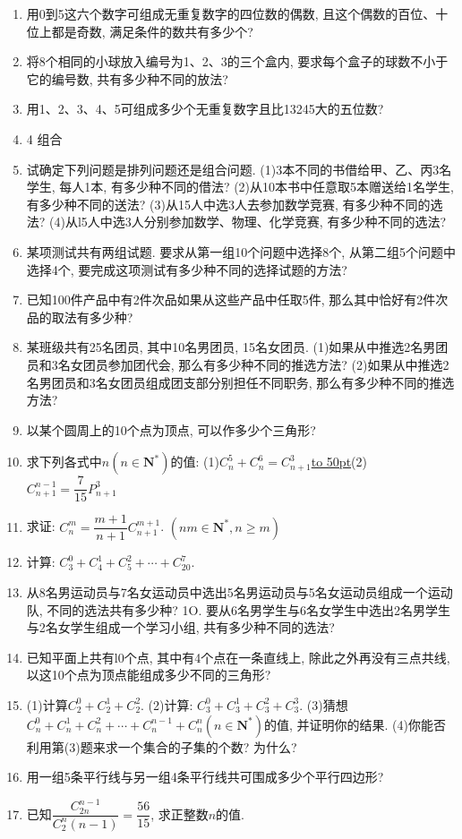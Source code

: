 \documentclass[10pt,a4paper]{article}
\newcommand{\blank}[1]{\underline{\hbox to #1pt{}}}
\begin{document}
\begin{enumerate}[1.]
\item 用0到5这六个数字可组成无重复数字的四位数的偶数, 且这个偶数的百位、十位上都是奇数, 满足条件的数共有多少个?
\item 将8个相同的小球放入编号为1、2、3的三个盒内, 要求每个盒子的球数不小于它的编号数, 共有多少种不同的放法?
\item 用1、2、3、4、5可组成多少个无重复数字且比13245大的五位数?
\item 4  组合
\item 试确定下列问题是排列问题还是组合问题.
(1)3本不同的书借给甲、乙、丙3名学生, 每人1本, 有多少种不同的借法?
(2)从10本书中任意取5本赠送给1名学生, 有多少种不同的送法?
(3)从15人中选3人去参加数学竞赛, 有多少种不同的选法?
(4)从l5人中选3人分别参加数学、物理、化学竞赛, 有多少种不同的选法?
\item 某项测试共有两组试题. 要求从第一组10个问题中选择8个, 从第二组5个问题中选择4个, 要完成这项测试有多少种不同的选择试题的方法?
\item 已知100件产品中有2件次品如果从这些产品中任取5件, 那么其中恰好有2件次品的取法有多少种?
\item 某班级共有25名团员, 其中10名男团员, 15名女团员.
(1)如果从中推选2名男团员和3名女团员参加团代会, 那么有多少种不同的推选方法?
(2)如果从中推选2名男团员和3名女团员组成团支部分别担任不同职务, 那么有多少种不同的推选方法?
\item 以某个圆周上的10个点为顶点, 可以作多少个三角形?
\item 求下列各式中$n(n\in \mathbf{N}^*)$的值:
(1)$C_n^5+C_n^6=C_{n+1}^3$\blank{50}(2)$C_{n+1}^{n-1}=\dfrac 7{15}P_{n+1}^3$
\item 求证: $C_n^m=\dfrac{m+1}{n+1}C_{n+1}^{m+1}$. $(nm\in \mathbf{N}^*,n\ge m)$
\item 计算: $C_3^0+C_4^1+C_5^2+\cdots +C_{20}^7$.
\item 从8名男运动员与7名女运动员中选出5名男运动员与5名女运动员组成一个运动队, 不同的选法共有多少种?
1O. 要从6名男学生与6名女学生中选出2名男学生与2名女学生组成一个学习小组, 共有多少种不同的选法?
\item 已知平面上共有l0个点, 其中有4个点在一条直线上, 除此之外再没有三点共线, 以这10个点为顶点能组成多少不同的三角形?
\item (1)计算$C_2^0+C_2^1+C_2^2$.
(2)计算: $C_3^0+C_3^1+C_3^2+C_3^3$.
(3)猜想$C_n^0+C_n^1+C_n^2+\cdots +C_n^{n-1}+C_n^n(n\in \mathbf{N}^*)$的值, 并证明你的结果.
(4)你能否利用第(3)题来求一个集合的子集的个数? 为什么?
\item 用一组5条平行线与另一组4条平行线共可围成多少个平行四边形?
\item 已知$\dfrac{C_{2n}^{n-1}}{C_2^n(n-1)}=\dfrac{56}{15}$, 求正整数$n$的值.

\end{enumerate}
\end{document}
